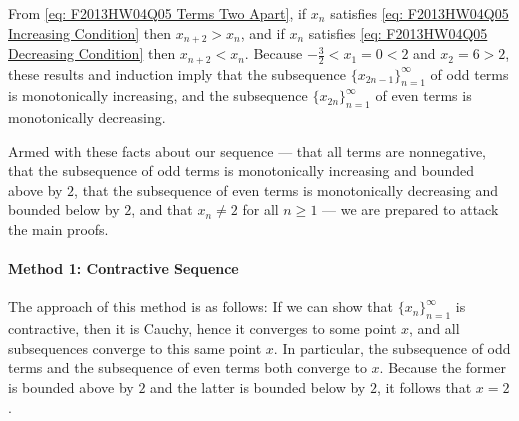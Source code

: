 From \eqref{eq: F2013HW04Q05 Terms Two Apart}, if $x_{n}$ satisfies \eqref{eq: F2013HW04Q05 Increasing Condition} then $x_{n+2} > x_{n}$, and if $x_{n}$ satisfies \eqref{eq: F2013HW04Q05 Decreasing Condition} then $x_{n+2} < x_{n}$. Because $-\frac{3}{2} < x_{1} = 0 < 2$ and $x_{2} = 6 > 2$, these results and induction imply that the subsequence $\{ x_{2 n - 1} \}_{n=1}^{\infty}$ of odd terms is monotonically increasing, and the subsequence $\{ x_{2 n} \}_{n=1}^{\infty}$ of even terms is monotonically decreasing.

Armed with these facts about our sequence --- that all terms are nonnegative, that the subsequence of odd terms is monotonically increasing and bounded above by $2$, that the subsequence of even terms is monotonically decreasing and bounded below by $2$, and that $x_{n} \neq 2$ for all $n \geq 1$ --- we are prepared to attack the main proofs.



\paragraph{Method 1: Contractive Sequence}

The approach of this method is as follows: If we can show that $\{ x_{n} \}_{n=1}^{\infty}$ is contractive, then it is Cauchy, hence it converges to some point $x$, and all subsequences converge to this same point $x$. In particular, the subsequence of odd terms and the subsequence of even terms both converge to $x$. Because the former is bounded above by $2$ and the latter is bounded below by $2$, it follows that $x = 2$.

